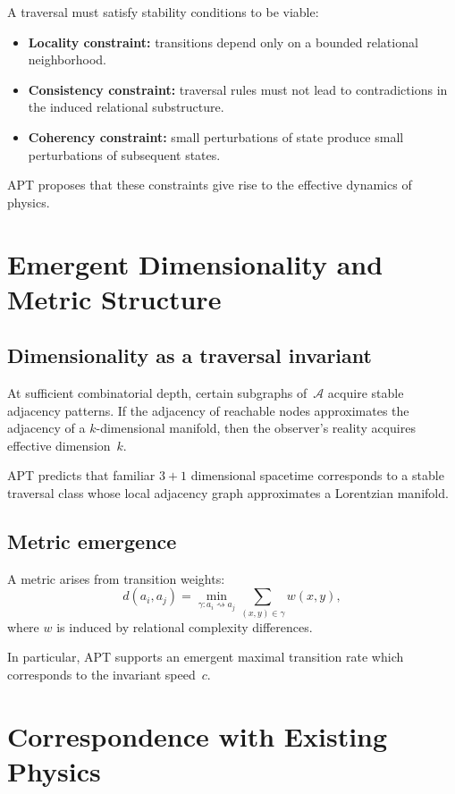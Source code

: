 \documentclass[12pt]{article}
\begin{document}
A traversal must satisfy stability conditions to be viable:
\begin{itemize}
    \item \textbf{Locality constraint:} transitions depend only on a 
    bounded relational neighborhood.
    \item \textbf{Consistency constraint:} traversal rules must not lead 
    to contradictions in the induced relational substructure.
    \item \textbf{Coherency constraint:} small perturbations of state 
    produce small perturbations of subsequent states.
\end{itemize}

APT proposes that these constraints give rise to the effective 
dynamics of physics.

\section{Emergent Dimensionality and Metric Structure}

\subsection{Dimensionality as a traversal invariant}

At sufficient combinatorial depth, certain subgraphs of~$\mathcal{A}$
acquire stable adjacency patterns.
If the adjacency of reachable nodes approximates the adjacency of a 
$k$-dimensional manifold, then the observer's reality acquires effective
dimension~$k$.

APT predicts that familiar $3+1$ dimensional spacetime corresponds to a
stable traversal class whose local adjacency graph approximates a 
Lorentzian manifold.

\subsection{Metric emergence}

A metric arises from transition weights:
\begin{equation}
d(a_i, a_j)
=
\min_{\gamma : a_i \rightsquigarrow a_j}
\sum_{(x,y) \in \gamma} w(x,y),
\end{equation}
where $w$ is induced by relational complexity differences.

In particular, APT supports an emergent maximal transition rate which
corresponds to the invariant speed~$c$.

\section{Correspondence with Existing Physics}
\end{document}
